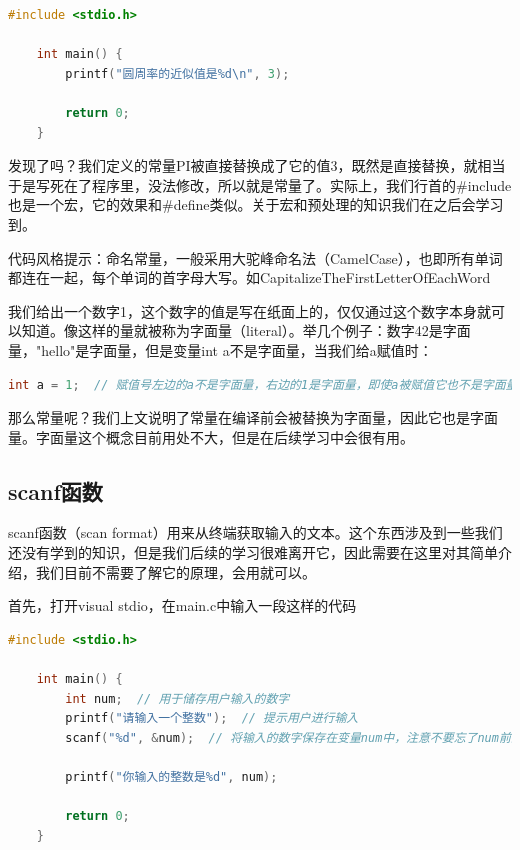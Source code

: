 \begin{lstlisting}[language=C]
    #include <stdio.h>

    int main() {
        printf("圆周率的近似值是%d\n", 3);

        return 0;
    }
\end{lstlisting}

发现了吗？我们定义的常量PI被直接替换成了它的值$3$，既然是直接替换，就相当于是写死在了程序里，没法修改，所以就是常量了。实际上，我们行首的\#include也是一个宏，它的效果和\#define类似。关于宏和预处理的知识我们在之后会学习到。

\begin{framed}
    代码风格提示：命名常量，一般采用大驼峰命名法（CamelCase），也即所有单词都连在一起，每个单词的首字母大写。如CapitalizeTheFirstLetterOfEachWord
\end{framed}

我们给出一个数字1，这个数字的值是写在纸面上的，仅仅通过这个数字本身就可以知道。像这样的量就被称为字面量（literal）。举几个例子：数字42是字面量，"hello"是字面量，但是变量int a不是字面量，当我们给a赋值时：

\begin{lstlisting}[language=C]
    int a = 1;  // 赋值号左边的a不是字面量，右边的1是字面量，即使a被赋值它也不是字面量，因为你无法仅仅从a这个名字本身判断它的值
\end{lstlisting}

那么常量呢？我们上文说明了常量在编译前会被替换为字面量，因此它也是字面量。字面量这个概念目前用处不大，但是在后续学习中会很有用。

\subsection{scanf函数}

scanf函数（scan format）用来从终端获取输入的文本。这个东西涉及到一些我们还没有学到的知识，但是我们后续的学习很难离开它，因此需要在这里对其简单介绍，我们目前不需要了解它的原理，会用就可以。

首先，打开visual stdio，在main.c中输入一段这样的代码

\begin{lstlisting}[language=C]
    #include <stdio.h>

    int main() {
        int num;  // 用于储存用户输入的数字
        printf("请输入一个整数");  // 提示用户进行输入
        scanf("%d", &num);  // 将输入的数字保存在变量num中，注意不要忘了num前的&

        printf("你输入的整数是%d", num);

        return 0;
    }
\end{lstlisting}

